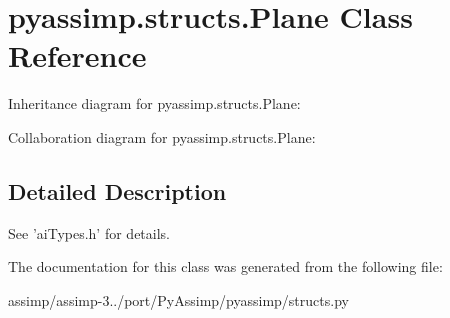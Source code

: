 \hypertarget{classpyassimp_1_1structs_1_1_plane}{\section{pyassimp.\+structs.\+Plane Class Reference}
\label{classpyassimp_1_1structs_1_1_plane}
}


Inheritance diagram for pyassimp.\+structs.\+Plane\+:


Collaboration diagram for pyassimp.\+structs.\+Plane\+:


\subsection{Detailed Description}
\begin{DoxyVerb}See 'aiTypes.h' for details.
\end{DoxyVerb}
 

The documentation for this class was generated from the following file\+:\begin{DoxyCompactItemize}
\item 
assimp/assimp-\/3../port/\+Py\+Assimp/pyassimp/structs.\+py\end{DoxyCompactItemize}
